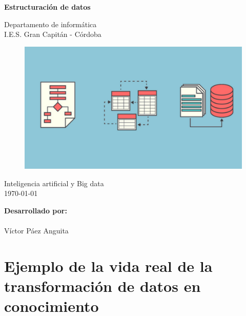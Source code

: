 \documentclass[12pt]{article}
\begin{document}
\begin{titlepage}
    \begin{center}
      \Large \bfseries{}
    \end{center}
    \vspace{0.1cm}
    \begin{center}
      \Large \bfseries{}
    \end{center}
    \vspace{0.1cm}
    \begin{center}
     \Large \bfseries{Estructuración de datos}
    \end{center}
    \vspace{0.0001cm}
    \begin{center}
        Departamento de informática \\ I.E.S. Gran Capitán - Córdoba
    \end{center}
        \vspace{2 cm}
\begin{figure}[h!]
    \centering
    \includegraphics[width=.6\textwidth]{portada.jpg}
    \label{fig:my_label}
\end{figure}
    \vspace{0.2 cm}
    \begin{center}
        Inteligencia artificial y Big data \\ \today 
    \end{center}
    \vspace{4 cm}
\null\hfill \textbf{Desarrollado por:}
\\
\\
\null\hfill Víctor Páez Anguita
\clearpage
\end{titlepage}

\tableofcontents
\clearpage


\section{Ejemplo de la vida real de la transformación de datos en conocimiento}
\end{document}
